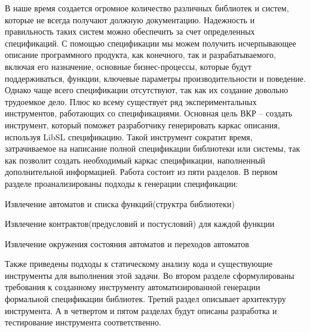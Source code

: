 \intro

В наше время создается огромное количество различных библиотек и систем, которые не всегда получают должную документацию. Надежность и правильность таких систем можно обеспечить за счет определенных спецификаций. С помощью спецификации мы можем получить исчерпывающее описание программного продукта, как конечного, так и разрабатываемого, включая его назначение, основные бизнес-процессы, которые будут поддерживаться, функции, ключевые параметры производительности и поведение.
Однако чаще всего спецификации отсутствуют, так как их создание довольно трудоемкое дело. Плюс ко всему существует ряд экспериментальных инструментов, работающих со спецификациями.
Основная цель ВКР – создать инструмент, который поможет разработчику генерировать каркас описания, используя LibSL спецификацию. Такой инструмент сократит время, затрачиваемое на написание полной спецификации библиотеки или системы, так как позволит создать необходимый каркас спецификации, наполненный дополнительной информацией.
Работа состоит из пяти разделов. В первом разделе проанализированы подходы к генерации спецификации:
%
\begin{itemize*}
\item Извлечение автоматов и списка функций(структра библиотеки)
\item Извлечение контрактов(предусловий и постусловий) для каждой функции
\item Извлечение окружения состояния автоматов и переходов автоматов
\end{itemize*}
%
Также приведены подходы к статическому анализу кода и существующие инструменты для выполнения этой задачи. Во втором разделе сформулированы требования к созданному инструменту автоматизированной генерации формальной спецификации библиотек. Третий раздел описывает архитектуру инструмента. А в четвертом и пятом разделах будут описаны разработка и тестирование инструмента соответственно.
